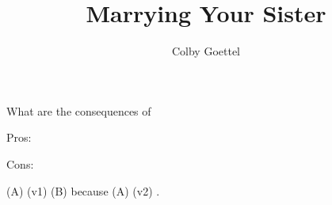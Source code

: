 \documentclass[12pt]{article}
\title{Marrying Your Sister}
\author{Colby Goettel}
\begin{document}
\maketitle





What are the consequences of 

Pros: 

Cons: 

 (A) \uline{} (v1)  (B) because  (A) \uline{} (v2) .

\end{document}
